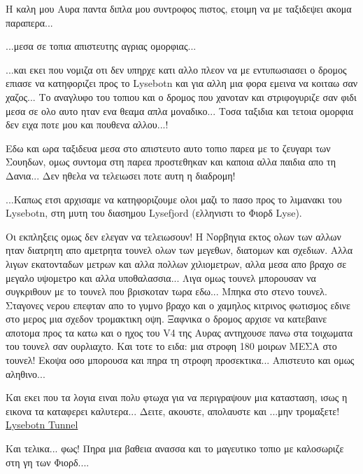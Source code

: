 
Η καλη μου Αυρα παντα διπλα μου συντροφος πιστος, ετοιμη να με ταξιδεψει ακομα παραπερα...


...μεσα σε τοπια απιστευτης αγριας ομορφιας...


...και εκει που νομιζα οτι δεν υπηρχε κατι αλλο πλεον να με εντυπωσιασει ο δρομος επιασε να κατηφοριζει προς το Lysebotn και για αλλη μια φορα εμεινα να κοιταω σαν χαζος...
Το αναγλυφο του τοπιου και ο δρομος που χανοταν και στριφογυριζε σαν φιδι μεσα σε ολο αυτο ηταν ενα θεαμα απλα μοναδικο... 
Τοσα ταξιδια και τετοια ομορφια δεν ειχα ποτε μου και πουθενα αλλου...!


Εδω και ωρα ταξιδευα μεσα στο απιστευτο αυτο τοπιο παρεα με το ζευγαρι των Σουηδων, ομως συντομα στη παρεα προστεθηκαν και καποια αλλα παιδια απο τη Δανια... Δεν ηθελα να τελειωσει ποτε αυτη η διαδρομη!


...Καπως ετσι αρχισαμε να κατηφοριζουμε ολοι μαζι το πασο προς το λιμανακι του Lysebotn, στη μυτη του διασημου Lysefjord (ελληνιστι το Φιορδ Lyse).


Οι εκπληξεις ομως δεν ελεγαν να τελειωσουν! Η Νορβηγια εκτος ολων των αλλων ηταν διατρητη απο αμετρητα τουνελ ολων των μεγεθων, διατομων και σχεδιων. Αλλα λιγων εκατονταδων μετρων και αλλα πολλων χιλιομετρων, αλλα μεσα απο βραχο σε μεγαλο υψομετρο και αλλα υποθαλασσια... Λιγα ομως τουνελ μπορουσαν να συγκριθουν με το τουνελ που βρισκοταν τωρα εδω... 
Μπηκα στο στενο τουνελ. 
Σταγονες νερου επεφταν απο το γυμνο βραχο και ο χαμηλος κιτρινος φωτισμος εδινε στο μερος μια σχεδον τρομακτικη οψη.
Ξαφνικα ο δρομος αρχισε να κατεβαινε αποτομα προς τα κατω και ο ηχος του V4 της Αυρας αντηχουσε πανω στα τοιχωματα του τουνελ σαν ουρλιαχτο. Και τοτε το ειδα: μια στροφη 180 μοιρων ΜΕΣΑ στο τουνελ! Εκοψα οσο μπορουσα και πηρα τη στροφη προσεκτικα... Απιστευτο και ομως αληθινο...

Και εκει που τα λογια ειναι πολυ φτωχα για να περιγραψουν μια κατασταση, ισως η εικονα τα καταφερει καλυτερα...
Δειτε, ακουστε, απολαυστε και ...μην τρομαξετε! \href{http://www.youtube.com/watch?v=Gt4kouWnKh0}{Lysebotn Tunnel}

Και τελικα... φως! Πηρα μια βαθεια ανασσα και το μαγευτικο τοπιο με καλοσωριζε στη γη των Φιορδ....

